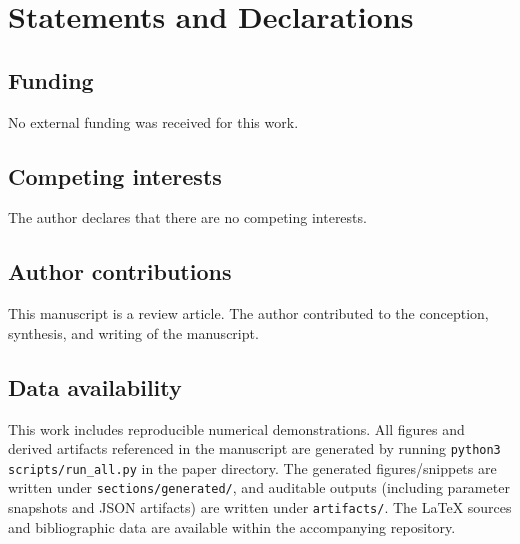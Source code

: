 \section*{Statements and Declarations}

\subsection*{Funding}
No external funding was received for this work.

\subsection*{Competing interests}
The author declares that there are no competing interests.

\subsection*{Author contributions}
This manuscript is a review article. The author contributed to the conception, synthesis, and writing of the manuscript.

\subsection*{Data availability}
This work includes reproducible numerical demonstrations. All figures and derived artifacts referenced in the manuscript are generated by running \texttt{python3 scripts/run\_all.py} in the paper directory. The generated figures/snippets are written under \texttt{sections/generated/}, and auditable outputs (including parameter snapshots and JSON artifacts) are written under \texttt{artifacts/}. The LaTeX sources and bibliographic data are available within the accompanying repository.

